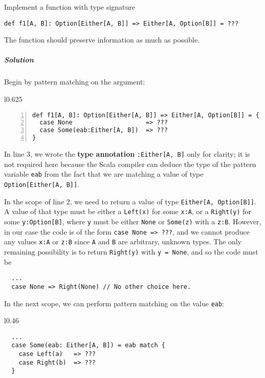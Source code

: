 Implement a function with type signature
\begin{lstlisting}
def f1[A, B]: Option[Either[A, B]] => Either[A, Option[B]] = ???
\end{lstlisting}
The function should preserve information as much as possible.

\subparagraph{Solution}

Begin by pattern matching on the argument:

\begin{wrapfigure}{l}{0.625\columnwidth}%
\vspace{-0.95\baselineskip}
\begin{lstlisting}[numbers=left]
def f1[A, B]: Option[Either[A, B]] => Either[A, Option[B]] = {
  case None                    => ???
  case Some(eab:Either[A, B])  => ???
}
\end{lstlisting}

\vspace{-1.15\baselineskip}
\end{wrapfigure}%

\noindent In line 3, we wrote the \textbf{type annotation}
\lstinline!:Either[A, B]! only for clarity; it is not required here
because the Scala compiler can deduce the type of the pattern variable
\lstinline!eab! from the fact that we are matching a value of type
\lstinline!Option[Either[A, B]]!.

In the scope of line 2, we need to return a value of type \lstinline!Either[A, Option[B]]!.
A value of that type must be either a \lstinline!Left(x)! for some
\lstinline!x:A!, or a \lstinline!Right(y)! for some \lstinline!y:Option[B]!,
where \lstinline!y! must be either \lstinline!None! or \lstinline!Some(z)!
with a \lstinline!z:B!. However, in our case the code is of the form
\lstinline!case None => ???!, and we cannot produce any values \lstinline!x:A!
or \lstinline!z:B! since \lstinline!A! and \lstinline!B! are arbitrary,
unknown types. The only remaining possibility is to return \lstinline!Right(y)!
with \lstinline!y = None!, and so the code must be
\begin{lstlisting}
  ...
  case None => Right(None) // No other choice here.
\end{lstlisting}

In the next scope, we can perform pattern matching on the value \lstinline!eab!:

\begin{wrapfigure}{l}{0.46\columnwidth}%
\vspace{-0.8\baselineskip}
\begin{lstlisting}
  ...
  case Some(eab: Either[A, B]) = eab match {
    case Left(a)   => ???
    case Right(b)  => ???
  }
\end{lstlisting}

\vspace{-0.9\baselineskip}
\end{wrapfigure}%


